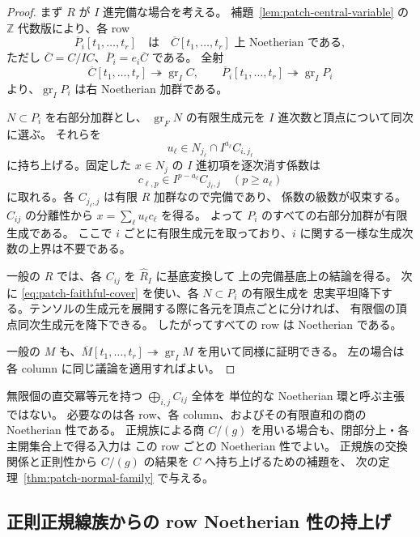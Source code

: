\begin{proof}
まず $R$ が $I$ 進完備な場合を考える。
補題~\ref{lem:patch-central-variable} の $\mathbb Z$ 代数版により、各 row
\[
 \overline P_i[t_1,\ldots,t_r]
 \quad\text{は}\quad
 \overline C[t_1,\ldots,t_r]
 \text{ 上 Noetherian である},
\]
ただし $\overline C=C/IC$、$\overline P_i=e_i\overline C$ である。
全射
\[
 \overline C[t_1,\ldots,t_r]\twoheadrightarrow\operatorname{gr}_I C,
 \qquad
 \overline P_i[t_1,\ldots,t_r]\twoheadrightarrow\operatorname{gr}_I P_i
\]
より、$\operatorname{gr}_I P_i$ は右 Noetherian 加群である。

$N\subset P_i$ を右部分加群とし、
$\operatorname{gr}_F N$ の有限生成元を $I$ 進次数と頂点について同次に選ぶ。
それらを
\[
 u_\ell\in N_{j_\ell}\cap I^{a_\ell}C_{i,j_\ell}
\]
に持ち上げる。固定した $x\in N_j$ の $I$ 進初項を逐次消す係数は
\[
 c_{\ell,p}\in I^{p-a_\ell}C_{j_\ell,j}
 \quad(p\geq a_\ell)
\]
に取れる。各 $C_{j_\ell,j}$ は有限 $R$ 加群なので完備であり、
係数の級数が収束する。$C_{ij}$ の分離性から
$x=\sum_\ell u_\ell c_\ell$ を得る。
よって $P_i$ のすべての右部分加群が有限生成である。
ここで $i$ ごとに有限生成元を取っており、$i$ に関する一様な生成次数の上界は不要である。

一般の $R$ では、各 $C_{ij}$ を $\widehat R_I$ に基底変換して
上の完備基底上の結論を得る。
次に \eqref{eq:patch-faithful-cover} を使い、各 $N\subset P_i$ の有限生成を
忠実平坦降下する。テンソルの生成元を展開する際に各元を頂点ごとに分ければ、
有限個の頂点同次生成元を降下できる。
したがってすべての row は Noetherian である。

一般の $M$ も、$\overline M[t_1,\ldots,t_r]\twoheadrightarrow\operatorname{gr}_I M$ を用いて同様に証明できる。
左の場合は各 column に同じ議論を適用すればよい。
\end{proof}

\begin{remark}
無限個の直交冪等元を持つ $\bigoplus_{i,j}C_{ij}$ 全体を
単位的な Noetherian 環と呼ぶ主張ではない。
必要なのは各 row、各 column、およびその有限直和の商の Noetherian 性である。
正規族による商 $C/(g)$ を用いる場合も、閉部分上・各主開集合上で得る入力は
この row ごとの Noetherian 性でよい。
正規族の交換関係と正則性から $C/(g)$ の結果を $C$ へ持ち上げるための補題を、
次の定理~\ref{thm:patch-normal-family} で与える。
\end{remark}

\subsection{正則正規線族からの row Noetherian 性の持上げ}

